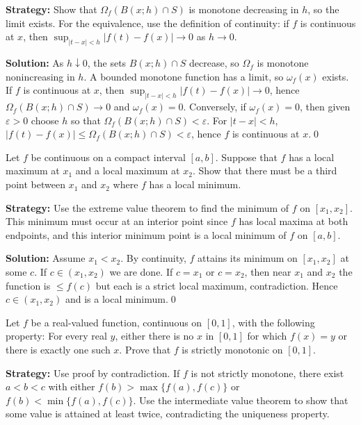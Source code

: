 \noindent\textbf{Strategy:} Show that $\Omega_f(B(x;h) \cap S)$ is monotone decreasing in $h$, so the limit exists. For the equivalence, use the definition of continuity: if $f$ is continuous at $x$, then $\sup_{|t-x|<h} |f(t) - f(x)| \to 0$ as $h \to 0$.

\bigskip\noindent\textbf{Solution:}
As $h\downarrow 0$, the sets $B(x;h)\cap S$ decrease, so $\Omega_f$ is monotone nonincreasing in $h$. A bounded monotone function has a limit, so $\omega_f(x)$ exists. If $f$ is continuous at $x$, then $\sup_{|t-x|<h}|f(t)-f(x)|\to 0$, hence $\Omega_f(B(x;h)\cap S)\to 0$ and $\omega_f(x)=0$. Conversely, if $\omega_f(x)=0$, then given $\varepsilon>0$ choose $h$ so that $\Omega_f(B(x;h)\cap S)<\varepsilon$. For $|t-x|<h$, $|f(t)-f(x)|\le \Omega_f(B(x;h)\cap S)<\varepsilon$, hence $f$ is continuous at $x$.\qed



\begin{problembox}
Let \( f \) be continuous on a compact interval \([a, b]\). Suppose that \( f \) has a local maximum at \( x_1 \) and a local maximum at \( x_2 \). Show that there must be a third point between \( x_1 \) and \( x_2 \) where \( f \) has a local minimum.
\end{problembox}

\noindent\textbf{Strategy:} Use the extreme value theorem to find the minimum of $f$ on $[x_1, x_2]$. This minimum must occur at an interior point since $f$ has local maxima at both endpoints, and this interior minimum point is a local minimum of $f$ on $[a,b]$.

\bigskip\noindent\textbf{Solution:}
Assume $x_1<x_2$. By continuity, $f$ attains its minimum on $[x_1,x_2]$ at some $c$. If $c\in(x_1,x_2)$ we are done. If $c=x_1$ or $c=x_2$, then near $x_1$ and $x_2$ the function is $\le f(c)$ but each is a strict local maximum, contradiction. Hence $c\in(x_1,x_2)$ and is a local minimum.\qed



\begin{problembox}
Let \( f \) be a real-valued function, continuous on \([0, 1]\), with the following property: For every real \( y \), either there is no \( x \) in \([0, 1]\) for which \( f(x) = y \) or there is exactly one such \( x \). Prove that \( f \) is strictly monotonic on \([0, 1]\).
\end{problembox}

\noindent\textbf{Strategy:} Use proof by contradiction. If $f$ is not strictly monotone, there exist $a < b < c$ with either $f(b) > \max\{f(a), f(c)\}$ or $f(b) < \min\{f(a), f(c)\}$. Use the intermediate value theorem to show that some value is attained at least twice, contradicting the uniqueness property.

